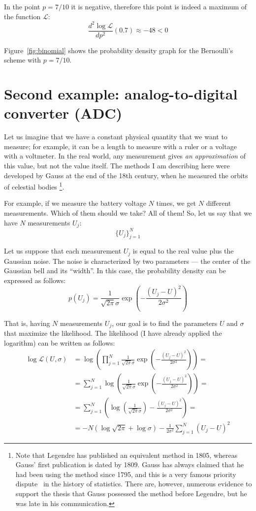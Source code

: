 \documentclass[notitlepage]{report}
\begin{document}
In the point $p=7/10$ it is negative, therefore this point is indeed a maximum of the function $\mathcal{L}$:
$$\frac{d^2 \log \mathcal{L}}{dp^2}(0.7)  \approx -48 < 0$$

Figure~\ref{fig:binomial} shows the probability density graph for the Bernoulli's scheme with $p=7/10$.


\section{Second example: analog-to-digital converter (ADC)}

Let us imagine that we have a constant physical quantity that we want to measure; for example, it can be a length to measure with a ruler or a voltage with a voltmeter.
In the real world, any measurement gives \textit{an approximation} of this value, but not the value itself.
The methods I am describing here were developed by Gauss at the end of the 18th century, when he measured the orbits of celestial bodies
\footnote{Note that Legendre has published an equivalent method in 1805, 
whereas Gauss' first publication is dated by 1809. Gauss has always claimed that he had been using the method since 1795,
and this is a very famous priority dispute~\cite{https://projecteuclid.org/download/pdf_1/euclid.aos/1176345451} in the history of statistics.
There are, however, numerous evidence to support the thesis that Gauss possessed the method before Legendre, but he was late in his communication.}.
~\cite{Theoria Motus Corporum Coelestium}

For example, if we measure the battery voltage $N$ times, we get $N$ different measurements. Which of them should we take? All of them! 
So, let us say that we have $N$ measurements $U_j$:
$$
\{U_j\}_{j=1}^{N}
$$

Let us suppose that each measurement $U_j$ is equal to the real value plus the Gaussian noise. 
The noise is characterized by two parameters --- the center of the Gaussian bell and its ``width''. 
In this case, the probability density can be expressed as follows:
$$
p(U_j) = \frac{1}{\sqrt{2\pi}\sigma} \exp\left(-\frac{(U_j-U)^2}{2\sigma^2}\right)
$$

That is, having $N$ measurements $U_j$, our goal is to find the parameters $U$ and $\sigma$ that maximize the likelihood.
The likelihood (I have already applied the logarithm) can be written as follows:
\begin{align*}
\log \mathcal{L}(U,\sigma) & = \log \left(\prod\limits_{j=1}^N  \frac{1}{\sqrt{2\pi}\sigma} \exp\left(-\frac{(U_j-U)^2}{2\sigma^2}\right)\right) =\\
& = \sum\limits_{j=1}^N \log \left(\frac{1}{\sqrt{2\pi}\sigma} \exp\left(-\frac{(U_j-U)^2}{2\sigma^2}\right)\right) = \\
& = \sum\limits_{j=1}^N \left(\log \left(\frac{1}{\sqrt{2\pi}\sigma}\right) -\frac{(U_j-U)^2}{2\sigma^2}\right) = \\
& = -N \left(\log\sqrt{2\pi} + \log\sigma\right) - \frac{1}{2\sigma^2} \sum\limits_{j=1}^N (U_j-U)^2
\end{align*}
\end{document}
